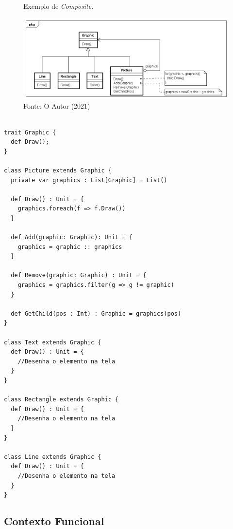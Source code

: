 \begin{figure}[htb]
	\caption{\label{composite_exemplo}Exemplo de \textit{Composite}.}
	\begin{center}
	    \includegraphics[scale=0.5]{5_padroes-contexto-funcional/5.2_estruturais/5.2.3_composite/composite_exemplo.png}
	\end{center}
  \caption*{Fonte: O Autor (2021)}
\end{figure}

\begin{lstlisting}[caption={\textit{Composite} Orientado a Objetos.},label=oocomposite]

trait Graphic {
  def Draw();
}

class Picture extends Graphic {
  private var graphics : List[Graphic] = List()

  def Draw() : Unit = {
    graphics.foreach(f => f.Draw())
  }

  def Add(graphic: Graphic): Unit = {
    graphics = graphic :: graphics
  }

  def Remove(graphic: Graphic) : Unit = {
    graphics = graphics.filter(g => g != graphic)
  }

  def GetChild(pos : Int) : Graphic = graphics(pos)
}

class Text extends Graphic {
  def Draw() : Unit = {
    //Desenha o elemento na tela
  }
}

class Rectangle extends Graphic {
  def Draw() : Unit = {
    //Desenha o elemento na tela
  }
}

class Line extends Graphic {
  def Draw() : Unit = {
    //Desenha o elemento na tela
  }
}

\end{lstlisting}

\subsection*{Contexto Funcional}

